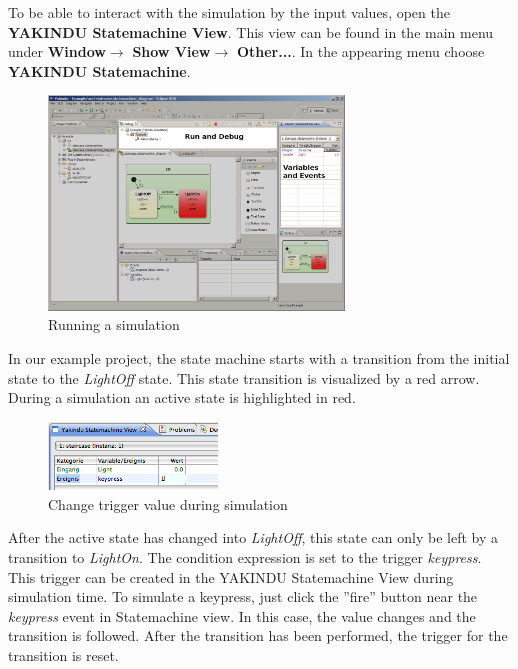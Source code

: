 To be able to interact with the simulation by the input values, open the
\textbf{YAKINDU Statemachine View}. This view can be found in the main menu under
\textbf{Window}$\rightarrow$ \textbf{Show View}$\rightarrow$ \textbf{Other...}.
In the appearing menu choose \textbf{YAKINDU Statemachine}.

\begin{figure}[ht] \center
\includegraphics[width=0.7\textwidth]{./Pictures/runningSim_1_1}
\caption{\label{fig:runningSim_1}Running a simulation}
\end{figure}
 

In our example project, the state machine starts with a transition from the
initial state to the \textit{LightOff} state. This state transition is visualized
by a red arrow. During a simulation an active state is highlighted in red.

\begin{figure}[ht] \center
\includegraphics[width=0.4\textwidth]{./Pictures/runningSim_2}
\caption{\label{fig:runningSim_2}Change trigger value during simulation}
\end{figure}

After the active state has changed into \textit{LightOff}, this state can only be
left by a transition to \textit{LightOn}. The condition expression is set to the
trigger \textit{keypress}. This trigger can be created in the YAKINDU
Statemachine View during simulation time.  To simulate a keypress, just click the
''fire'' button near the \textit{keypress} event in Statemachine view. In this
case, the value changes and the transition is followed. After the transition has
been performed, the trigger for the transition is reset.

